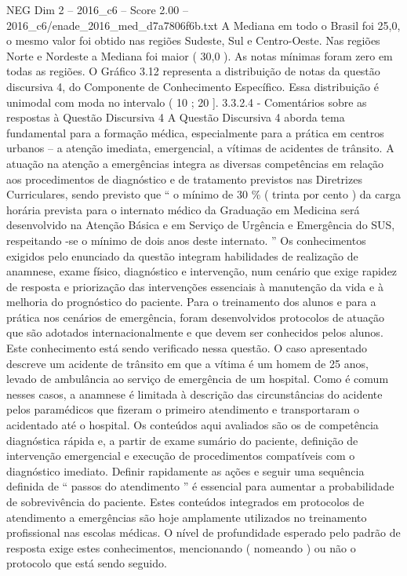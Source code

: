 \begin{textsample}{NEG Dim 2 – 2016\_c6 – Score 2.00 – 2016\_c6/enade\_2016\_med\_d7a7806f6b.txt}
A Mediana em todo o Brasil foi 25,0, o mesmo valor foi obtido nas regiões Sudeste, Sul e Centro-Oeste.
Nas regiões Norte e Nordeste a Mediana foi maior ( 30,0 ).
As notas mínimas foram zero em todas as regiões.
O Gráfico 3.12 representa a distribuição de notas da questão discursiva 4, do Componente de Conhecimento Específico.
Essa distribuição é unimodal com moda no intervalo ( 10 ; 20 ]. 3.3.2.4 - Comentários sobre as respostas à Questão Discursiva 4 A Questão Discursiva 4 aborda tema fundamental para a formação médica, especialmente para a prática em centros urbanos – a atenção imediata, emergencial, a vítimas de acidentes de trânsito.
A atuação na atenção a emergências integra as diversas competências em relação aos procedimentos de diagnóstico e de tratamento previstos nas Diretrizes Curriculares, sendo previsto que “ o mínimo de 30 \% ( trinta por cento ) da carga horária prevista para o internato médico da Graduação em Medicina será desenvolvido na Atenção Básica e em Serviço de Urgência e Emergência do SUS, respeitando -se o mínimo de dois anos deste internato. ” Os conhecimentos exigidos pelo enunciado da questão integram habilidades de realização de anamnese, exame físico, diagnóstico e intervenção, num cenário que exige rapidez de resposta e priorização das intervenções essenciais à manutenção da vida e à melhoria do prognóstico do paciente.
Para o treinamento dos alunos e para a prática nos cenários de emergência, foram desenvolvidos protocolos de atuação que são adotados internacionalmente e que devem ser conhecidos pelos alunos.
Este conhecimento está sendo verificado nessa questão.
O caso apresentado descreve um acidente de trânsito em que a vítima é um homem de 25 anos, levado de ambulância ao serviço de emergência de um hospital.
Como é comum nesses casos, a anamnese é limitada à descrição das circunstâncias do acidente pelos paramédicos que fizeram o primeiro atendimento e transportaram o acidentado até o hospital.
Os conteúdos aqui avaliados são os de competência diagnóstica rápida e, a partir de exame sumário do paciente, definição de intervenção emergencial e execução de procedimentos compatíveis com o diagnóstico imediato.
Definir rapidamente as ações e seguir uma sequência definida de “ passos do atendimento ” é essencial para aumentar a probabilidade de sobrevivência do paciente.
Estes conteúdos integrados em protocolos de atendimento a emergências são hoje amplamente utilizados no treinamento profissional nas escolas médicas.
O nível de profundidade esperado pelo padrão de resposta exige estes conhecimentos, mencionando ( nomeando ) ou não o protocolo que está sendo seguido.

\end{textsample}

